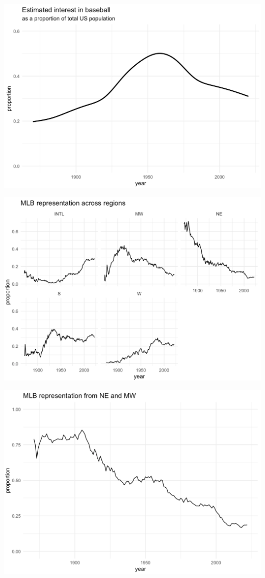 \documentclass[
  ignorenonframetext,
]{beamer}
\begin{document}
\begin{frame}{}
\protect\hypertarget{section-8}{}
\includegraphics{interest_baseball.png}
\end{frame}

\begin{frame}{}
\protect\hypertarget{section-9}{}
\includegraphics{regional_MLB_demo.png}
\end{frame}

\begin{frame}{}
\protect\hypertarget{section-10}{}
\includegraphics{NEplusMW_MLB_demo.png}
\end{frame}
\end{document}
